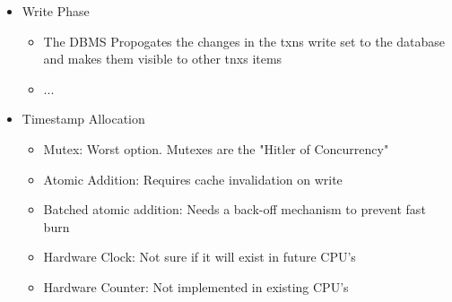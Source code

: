 \documentclass[11pt]{article}
\begin{document}
\begin{itemize}
\begin{itemize}
\begin{itemize}
        \end{itemize}
        \item Write Phase
        \begin{itemize}
            \item The DBMS Propogates the changes in the txns write set to the database and makes them visible to other tnxs
            items
            \item ...
        \end{itemize}
        \item Timestamp Allocation~\cite{p209-yu}
        \begin{itemize}
            \item Mutex: Worst option. Mutexes are the "Hitler of Concurrency"
            \item Atomic Addition: Requires cache invalidation on write
            \item Batched atomic addition: Needs a back-off mechanism to prevent fast burn
            \item Hardware Clock: Not sure if it will exist in future CPU's
            \item Hardware Counter: Not implemented in existing CPU's
        \end{itemize}
    \end{itemize}
\end{itemize}
\end{document}
